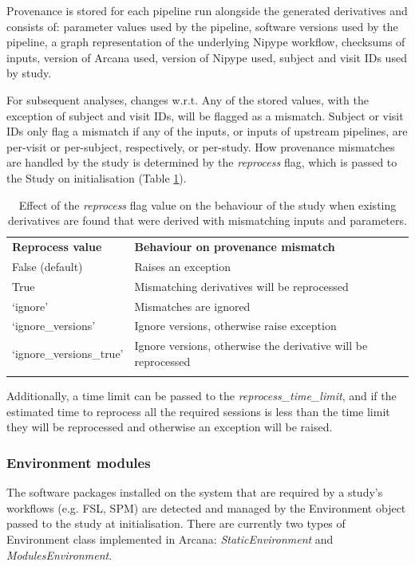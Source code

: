 \documentclass[smallextended]{svjour3}       %
\begin{document}
Provenance is stored for each pipeline run alongside the generated
derivatives and consists of: parameter values used by the pipeline,
software versions used by the pipeline, a graph representation of the
underlying Nipype workflow, checksums of inputs, version of Arcana used,
version of Nipype used, subject and visit IDs used by study.

For subsequent analyses, changes w.r.t. Any of the stored values, with
the exception of subject and visit IDs, will be flagged as a mismatch.
Subject or visit IDs only flag a mismatch if any of the inputs, or
inputs of upstream pipelines, are per-visit or per-subject,
respectively, or per-study. How provenance mismatches are handled by the
study is determined by the \emph{reprocess} flag, which is passed to the
Study on initialisation (Table \ref{tbl:reprocess-flag}).


\begin{table}
\caption{Effect of the \emph{reprocess} flag value on the
behaviour of the study when existing derivatives are found that were
derived with mismatching inputs and parameters.}
\label{tbl:reprocess-flag} 
\begin{tabular}{ll}
\hline\noalign{\smallskip}
\textbf{Reprocess value} & \textbf{Behaviour on provenance mismatch} \\
\noalign{\smallskip}\hline\noalign{\smallskip}
False (default) & Raises an exception \\
True & Mismatching derivatives will be reprocessed \\
`ignore' & Mismatches are ignored \\
`ignore\_versions' & Ignore versions, otherwise raise exception \\
`ignore\_versions\_true' & Ignore versions, otherwise the derivative will be reprocessed \\
\noalign{\smallskip}\hline
\end{tabular}
\end{table}

Additionally, a time limit can be passed to the
\emph{reprocess\_time\_limit}, and if the estimated time to reprocess
all the required sessions is less than the time limit they will be
reprocessed and otherwise an exception will be raised.

\subsubsection*{Environment modules}

The software packages installed on the system that are required by a study's
workflows (e.g. FSL, SPM) are detected and managed by
the Environment object passed to the study at initialisation.
There are currently two types of Environment class implemented in Arcana:
\emph{StaticEnvironment} and \emph{ModulesEnvironment}.
\end{document}
